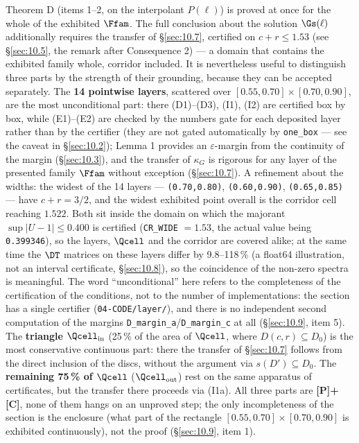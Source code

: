 Theorem D (items 1--2, on the interpolant $P(\ell)$) is proved at once for the
whole of the exhibited $\Ffam$. The full conclusion about the solution $\Gs(\ell)$
additionally requires the transfer of \S\ref{sec:10.7}, certified on $c+r\leq 1.53$ (see
\S\ref{sec:10.5}, the remark after Consequence 2) --- a domain that contains the exhibited
family whole, corridor included. It is nevertheless useful to distinguish three parts by the
strength of their grounding, because they can be accepted separately. The
\textbf{14 pointwise layers}, scattered over $[0.55,0.70]\times[0.70,0.90]$, are the
most unconditional part: there (D1)--(D3), (I1), (I2) are certified box by
box, while (E1)--(E2) are checked by the numbers gate for each deposited layer
rather than by the certifier (they are not gated
automatically by \texttt{one\_box} --- see the caveat in \S\ref{sec:10.2});
Lemma 1 provides an $\varepsilon$-margin from the
continuity of the margin (\S\ref{sec:10.3}), and the transfer of $\kappa_G$ is rigorous for any
layer of the presented family $\Ffam$ without exception (\S\ref{sec:10.7}). A refinement about the widths: the widest of the
14 layers --- \texttt{(0.70,0.80)}, \texttt{(0.60,0.90)}, \texttt{(0.65,0.85)} --- have $c+r=3/2$, and the
widest exhibited point overall is the corridor cell reaching $1.522$. Both sit inside the
domain on which the majorant $\sup|U-1|\leq 0.400$ is certified
(\texttt{CR\_\allowbreak WIDE} $=1.53$, the actual value being \texttt{0.399346}), so the layers, $\Qcell$
and the corridor are covered alike;
at the same time the $\DT$ matrices on these layers
differ by 9.8--118\,\% (a float64 illustration, not an interval certificate, \S\ref{sec:10.8}), so the coincidence of the non-zero spectra is
meaningful.
The word ``unconditional'' here refers to the completeness of the certification
of the conditions, not to the number of implementations: the section has a
single certifier (\texttt{04-\allowbreak CODE/\allowbreak layer/\allowbreak }), and there is no independent second
computation of the margins \texttt{D\_margin\_a}/\texttt{D\_margin\_c} at all (\S\ref{sec:10.9}, item 5).
The \textbf{triangle $\Qcell_{\mathrm{in}}$} (25\,\% of the area of $\Qcell$, where $D(c,r) \subseteq D_0$) is the
most conservative continuous part: there the transfer of \S\ref{sec:10.7} follows from the
direct inclusion of the discs, without the argument via $s(D') \subseteq D_0$. The
\textbf{remaining 75\,\% of $\Qcell$} ($\Qcell_{\mathrm{out}}$) rest on the same apparatus of
certificates, but the transfer there proceeds via (I1a). All three parts are
\textbf{[P]+[C]}, none of them hangs on an unproved step; the only incompleteness
of the section is the enclosure (what part of the rectangle
$[0.55,0.70]\times[0.70,0.90]$ is exhibited continuously), not the proof (\S\ref{sec:10.9},
item 1).



